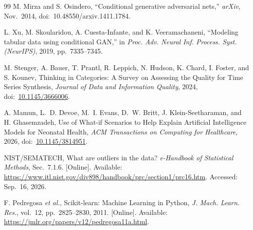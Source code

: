 \documentclass[journal]{IEEEtran}
\begin{document}
\begin{thebibliography}{99}
M. Mirza and S. Osindero, ``Conditional generative adversarial nets,'' \textit{arXiv}, Nov.~2014, doi:~10.48550/arxiv.1411.1784.

L. Xu, M. Skoularidou, A. Cuesta-Infante, and K. Veeramachaneni, ``Modeling tabular data using conditional GAN,'' in \textit{Proc. Adv. Neural Inf. Process. Syst. (NeurIPS)}, 2019, pp.~7335--7345.

M. Stenger, A. Bauer, T. Prantl, R. Leppich, N. Hudson, K. Chard, I. Foster, and S. Kounev, Thinking in Categories: A Survey on Assessing the Quality for Time Series Synthesis, \textit{Journal of Data and Information Quality}, 2024, doi:~\href{https://doi.org/10.1145/3666006}{10.1145/3666006}.

A. Mamun, L.~D. Devoe, M.~I. Evans, D.~W. Britt, J. Klein-Seetharaman, and H. Ghasemzadeh, Use of What-if Scenarios to Help Explain Artificial Intelligence Models for Neonatal Health, \textit{ACM Transactions on Computing for Healthcare}, 2026, doi:~\href{https://doi.org/10.1145/3814951}{10.1145/3814951}.

NIST/SEMATECH, What are outliers in the data? \textit{e-Handbook of Statistical Methods}, Sec.~7.1.6. [Online]. Available: \url{https://www.itl.nist.gov/div898/handbook/prc/section1/prc16.htm}. Accessed: Sep.~16, 2026.

F. Pedregosa \textit{et al.}, Scikit-learn: Machine Learning in Python, \textit{J. Mach. Learn. Res.}, vol.~12, pp.~2825--2830, 2011. [Online]. Available: \url{https://jmlr.org/papers/v12/pedregosa11a.html}.

\end{thebibliography}
\end{document}
